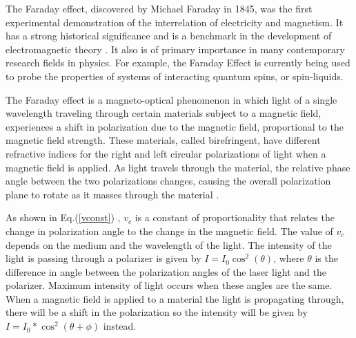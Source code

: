\documentclass[prb,preprint]{revtex4-1}
\begin{document}
{The Faraday effect, discovered by Michael Faraday in 1845, was the first experimental demonstration of the interrelation of electricity and magnetism.  
It has a strong historical significance and is a benchmark in the development of electromagnetic theory \cite{melissinos}.  
It also is of primary importance in many contemporary research fields in physics.  
For example, the Faraday Effect is currently being used to probe the properties of systems of interacting quantum spins, or spin-liquids.\cite{spin}


The Faraday effect is a magneto-optical phenomenon in which light of a single wavelength traveling through certain materials subject to a magnetic field, experiences a shift in polarization due to the magnetic field, proportional to the magnetic field strength. 
These materials, called birefringent, have different refractive indices for the right and left circular polarizations of light when a magnetic field is applied. 
As light travels through the material, the relative phase angle between the two polarizations changes, causing the overall polarization plane to rotate as it masses through the material \cite{melissinos}.  

As shown in Eq.(\ref{vconst}) , $v_c$ is a constant of proportionality that relates the change in polarization angle to the change in the magnetic field.\cite{expphysics} 
The value of $v_c$ depends on the medium and the wavelength of the light. 
The intensity of the light is passing through a polarizer is given by $I=I_{0}\cos^{2}(\theta)$, where $\theta$ is the difference in angle between the polarization angles of the laser light and the polarizer.  Maximum intensity of light occurs when these angles are the same. 
When a magnetic field is applied to a material the light is propagating through, there will be a shift in the polarization so the intensity will be given by $I=I_{0}*\cos^{2}(\theta+\phi)$ instead.
}
\end{document}

